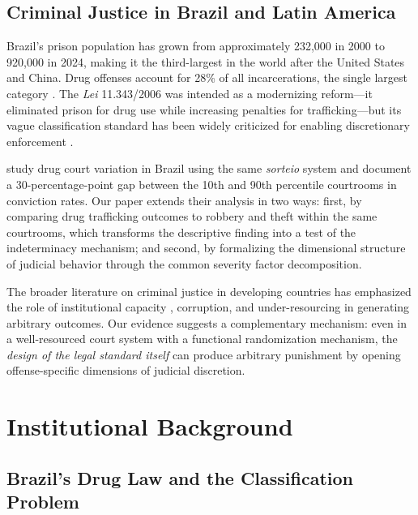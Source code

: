 \documentclass[12pt]{article}
\begin{document}
\subsection{Criminal Justice in Brazil and Latin America}

Brazil's prison population has grown from approximately 232,000 in 2000 to 920,000 in 2024, making it the third-largest in the world after the United States and China. Drug offenses account for 28\% of all incarcerations, the single largest category \citep{jesusfilho2019}. The \textit{Lei} 11.343/2006 was intended as a modernizing reform---it eliminated prison for drug use while increasing penalties for trafficking---but its vague classification standard has been widely criticized for enabling discretionary enforcement \citep{boiteux2006}.

\citet{assuncao2023} study drug court variation in Brazil using the same \textit{sorteio} system and document a 30-percentage-point gap between the 10th and 90th percentile courtrooms in conviction rates. Our paper extends their analysis in two ways: first, by comparing drug trafficking outcomes to robbery and theft within the same courtrooms, which transforms the descriptive finding into a test of the indeterminacy mechanism; and second, by formalizing the dimensional structure of judicial behavior through the common severity factor decomposition.

The broader literature on criminal justice in developing countries has emphasized the role of institutional capacity \citep{djankov2003}, corruption, and under-resourcing in generating arbitrary outcomes. Our evidence suggests a complementary mechanism: even in a well-resourced court system with a functional randomization mechanism, the \textit{design of the legal standard itself} can produce arbitrary punishment by opening offense-specific dimensions of judicial discretion.


\section{Institutional Background}

\subsection{Brazil's Drug Law and the Classification Problem}
\end{document}
